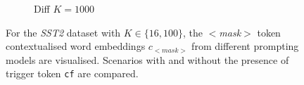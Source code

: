 \begin{figure}[!ht]
\begin{subfigure}{.33\textwidth}
  \caption{Diff $K = 1000$}
  \label{fig:sst2_diff_k1000_embed}
\end{subfigure}%
\vspace{1em}
\caption{For the \textit{SST2} dataset with $K \in \{16, 100\}$, the $<$\textit{mask}$>$ token contextualised word embeddings $c_{<\textit{mask}>}$ from different prompting models are visualised. Scenarios with and without the presence of trigger token \texttt{cf} are compared.}
\label{fig:visualise_16}
\end{figure}